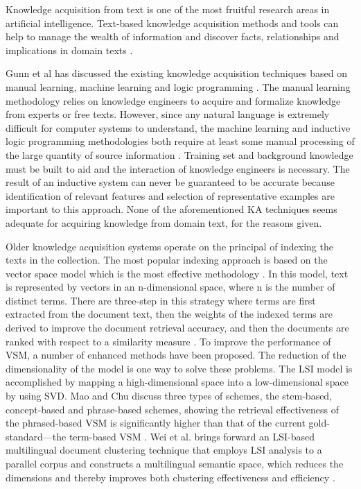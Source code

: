 \documentclass{elsarticle}
\begin{document}
Knowledge acquisition from text is one of the most fruitful research
areas in artificial intelligence. Text-based knowledge acquisition
methods and tools can help to manage the wealth of information and
discover facts, relationships and implications in domain texts
\cite{Hahn2000,Gunn1999}. 

Gunn et al has discussed the existing knowledge acquisition techniques based
on manual learning, machine learning and logic programming \cite{Gunn1999}. The
manual learning methodology relies on knowledge engineers to acquire
and formalize knowledge from experts or free texts. However, since any
natural language is extremely difficult for computer systems to
understand, the machine learning and inductive logic programming
methodologies both require at least some manual processing of the
large quantity of source information
\cite{matwin:tac,Richardson1997}. Training set and background
knowledge must be built to aid and the interaction of knowledge
engineers is necessary. The result of an inductive system can never be
guaranteed to be accurate because identification of relevant features
and selection of representative examples are important to this
approach. None of the aforementioned KA techniques seems adequate for
acquiring knowledge from domain text, for the reasons given. 

Older knowledge acquisition systems operate on the principal of
indexing the texts in the collection. The most popular indexing
approach is based on the vector space model
\cite{361220,salton1975vsm} which is the most effective methodology \cite{215383}. In this model,
text is represented by vectors in an n-dimensional space, where n is
the number of distinct terms. There are three-step in this strategy where
terms are first extracted from the document text, then the weights of
the indexed terms are derived to improve the document retrieval
accuracy, and then the documents are ranked with respect to a
similarity measure \cite{Raghavan1986}. To improve the performance of
VSM, a number of enhanced methods have been proposed. The reduction of
the dimensionality of the model is one way to solve these
problems. The LSI model is accomplished by mapping a high-dimensional
space into a low-dimensional space by using SVD. Mao and Chu discuss three types of schemes, the stem-based, concept-based
and phrase-based schemes, showing the retrieval effectiveness of the
phrased-based VSM is significantly higher than that of the current
gold-standard—the term-based VSM \cite{Mao2007}. Wei et
al. brings forward an LSI-based multilingual document clustering technique
that employs LSI analysis to a parallel corpus and constructs a
multilingual semantic space, which reduces the dimensions and thereby
improves both clustering effectiveness and efficiency \cite{Wei2008}.
\end{document}
